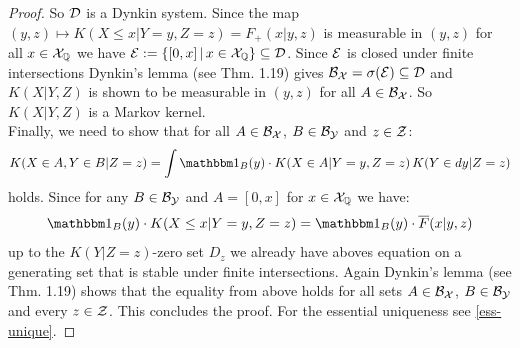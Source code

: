 \begin{Thm}
\begin{proof}
So $\mathcal{D}$ is a Dynkin system.  
Since the map $(y,z) \mapsto K(X \le x|Y=y,Z=z)=F_+(x|y,z)$ is measurable in $(y,z)$ for all $x \in \mathcal{X}_{\mathbb{Q}}$ we have 
$\mathcal{E}:=\{ [0,x] \,|\, x \in \mathcal{X}_{\mathbb{Q}}\} \subseteq \mathcal{D}$. Since $\mathcal{E}$ is closed under finite intersections 
Dynkin's lemma (see \cite{Kle14} Thm. 1.19) gives $\mathcal{B}_{\mathcal{X}}=\sigma(\mathcal{E}) \subseteq \mathcal{D}$ and $K(X|Y,Z)$ is shown to be measurable in $(y,z)$ for all $A \in \mathcal{B}_{\mathcal{X}}$. So $K(X|Y,Z)$ is a Markov kernel.\\
Finally, we need to show that for all $A \in \mathcal{B}_{\mathcal{X}}$, $B \in \mathcal{B}_{\mathcal{Y}}$ and $z \in \mathcal{Z}$:
$$ K(X \in A, Y \in B |Z=z) = \int \I_B(y) \cdot K(X \in A | Y=y,Z=z) \, K(Y \in dy | Z=z) $$ 
holds. 
Since for any $B \in \mathcal{B}_{\mathcal{Y}}$ and $A=[0,x]$ for $x \in \mathcal{X}_{\mathbb{Q}}$ we have:
$$\I_B(y) \cdot K(X \le x | Y=y,Z=z) = \I_B(y) \cdot \overline F(x|y,z)$$
up to the $K(Y|Z=z)$-zero set $D_z$ we already have aboves equation on a generating set that is stable under finite intersections.
Again Dynkin's lemma (see \cite{Kle14} Thm. 1.19) shows that the equality from above holds for all sets $A \in \mathcal{B}_{\mathcal{X}}$, $B \in \mathcal{B}_{\mathcal{Y}}$ and every $z \in \mathcal{Z}$.
This concludes the proof.
For the essential uniqueness see \ref{ess-unique}.
\end{proof}
\end{Thm}

